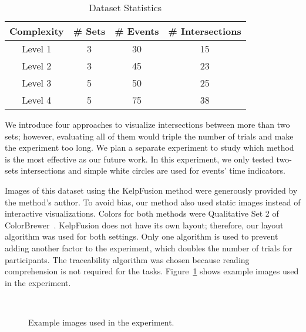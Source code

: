 \begin{table}[ht]
\centering
\sffamily\small
\caption{Dataset Statistics}
\label{table:dataset}
\begin{tabular}{cccc}
	\toprule
	\textbf{Complexity} & \textbf{\# Sets} & \textbf{\# Events} & \textbf{\# Intersections} \\ 
	\midrule
	Level 1 & 3 & 30 & 15 \\ 
	Level 2 & 3 & 45 & 23 \\ 
	Level 3 & 5 & 50 & 25 \\ 
	Level 4 & 5 & 75 & 38 \\ 
	\bottomrule
\end{tabular} 
\end{table}

We introduce four approaches to visualize intersections between more than two sets; however, evaluating all of them would triple the number of trials and make the experiment too long. We plan a separate experiment to study which method is the most effective as our future work. In this experiment, we only tested two-sets intersections and simple white circles are used for events' time indicators. 

Images of this dataset using the KelpFusion method were generously provided by the method's author. To avoid bias, our method also used static images instead of interactive visualizations. Colors for both methods were Qualitative Set 2 of ColorBrewer~\cite{Harrower2003}. KelpFusion does not have its own layout; therefore, our layout algorithm was used for both settings. Only one algorithm is used to prevent adding another factor to the experiment, which doubles the number of trials for participants. The traceability algorithm was chosen because reading comprehension is not required for the tasks. Figure~\ref{fig:evaluation} shows example images used in the experiment. 

\begin{figure}[!htb]
	\centering
	\\
	\caption{Example images used in the experiment.}
	\label{fig:evaluation}
\end{figure}

